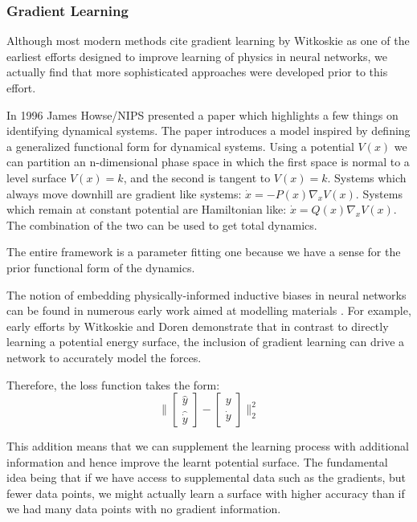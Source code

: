 \documentclass{article}
\begin{document}
\subsubsection{Gradient Learning}

Although most modern methods cite gradient learning by Witkoskie as one of the earliest efforts designed to improve learning of physics in neural networks, we actually find that more sophisticated approaches were developed prior to this effort.

In 1996 James Howse/NIPS presented a paper which highlights a few things on identifying dynamical systems. The paper introduces a model inspired by defining a generalized functional form for dynamical systems. Using a potential $V(x)$ we can partition an n-dimensional phase space in which the first space is normal to a level surface $V(x)=k$, and the second is tangent to $V(x)=k$. Systems which always move downhill are gradient like systems: $ \dot{x} = - P(x)\nabla_{x} V(x) $. Systems which remain at constant potential are Hamiltonian like: $\dot{x} = Q(x)\nabla_x V(x)$. The combination of the two can  be used to get total dynamics.

The entire framework is a parameter fitting one because we have a sense for the prior functional form of the dynamics.

The notion of embedding physically-informed inductive biases in neural networks can be found in numerous early work aimed at modelling materials \cite{witkoskie_neural_2005, pukrittayakamee_simultaneous_2009, smith_ani-1_2017, rupp_fast_2012, yao_tensormol-01_2018}. For example, early efforts by Witkoskie and Doren \cite{witkoskie_neural_2005} demonstrate that in contrast to directly learning a potential energy surface, the inclusion of gradient learning can drive a network to accurately model the forces. 

Therefore, the loss function takes the form:
$$
\Bigg\|
\begin{bmatrix}
\hat{y} \\
\hat{\dot{y}}
\end{bmatrix}
-
\begin{bmatrix}
y \\
\dot{y}
\end{bmatrix}
\Bigg\|_2^2
$$

This addition means that we can supplement the learning process with additional information and hence improve the learnt potential surface. The fundamental idea being that if we have access to supplemental data such as the gradients, but fewer data points, we might actually learn a surface with higher accuracy than if we had many data points with no gradient information. 
\end{document}
